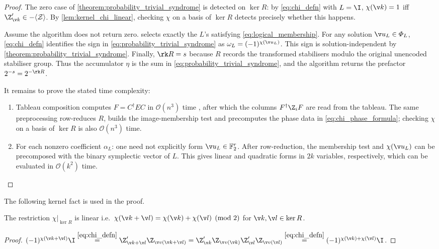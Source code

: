 \begin{proof}
The zero case of \cref{theorem:probability_trivial_syndrome}
is detected on $\ker R$:
by \cref{eq:chi_defn} with $L=\I$,
$\chi(\v k)=1$ iff
$\Z'_{\v k}\in-\langle\mathcal Z\rangle$.
By \cref{lem:kernel_chi_linear},
checking $\chi$ on a basis of $\ker R$
detects precisely whether this happens.

Assume the algorithm does not return zero.
 selects
exactly the $L$'s satisfying \cref{eq:logical_membership}.
For any solution $\v u_L\in\Phi_L$,
\cref{eq:chi_defn} identifies the sign in
\cref{eq:probability_trivial_syndrome} as
$\omega_L=(-1)^{\chi(\v u_L)}$.
This sign is solution-independent by
\cref{theorem:probability_trivial_syndrome}.
Finally,
$\rk R=s$
because $R$ records the transformed stabilisers modulo
the original unencoded stabiliser group.
Thus the accumulator $\eta$ is the sum in
\cref{eq:probability_trivial_syndrome},
and the algorithm returns the prefactor $2^{-s}=2^{-\rk R}$.

It remains to prove the stated time complexity:
\begin{enumerate}
	\item Tableau composition computes
	$F=C^\dag EC$ in $\mathcal O(n^3)$ time
	\cite[\S III]{Aaronson2004}
	\cite[\S 2.3.2]{Gidney2021a},
	after which the columns $F^\dag\Z_iF$ are read from the tableau.
	The same preprocessing row-reduces $R$, builds the image-membership test
	and precomputes the phase data in
	\cref{eq:chi_phase_formula}; checking $\chi$ on a basis of $\ker R$
	is also $\mathcal O(n^3)$ time.
	\item For each nonzero coefficient $\alpha_L$:
	one need not explicitly form $\v u_L\in\mathbb{F}_2^r$.
	After row-reduction, the membership test and
	$\chi(\v u_L)$ can be precomposed with the binary symplectic
	vector of $L$. This gives linear and quadratic forms in $2k$ variables,
	respectively, which can be evaluated in $\mathcal O(k^2)$ time.
	\qedhere
\end{enumerate}
\end{proof}

\noindent
The following kernel fact is used in the proof.

\begin{lem}
\label{lem:kernel_chi_linear}
The restriction $\chi|_{\ker R}$ is linear
i.e.\ $\chi(\v k+\v l)
=\chi(\v k)+\chi(\v l)\pmod 2$ for $\v k, \v l \in \ker R$.
\end{lem}
\begin{proof}
$
(-1)^{\chi(\v k+\v l)}\I
\overset{\eqref{eq:chi_defn}}=
\Z_{\v k+\v l}'\Z_{\v v(\v k+\v l)}
=
\Z_{\v k}'\Z_{\v v(\v k)}
\Z_{\v l}'\Z_{\v v(\v l)}
\overset{\eqref{eq:chi_defn}}=
(-1)^{\chi(\v k)+\chi(\v l)}
\I$.
\end{proof}

